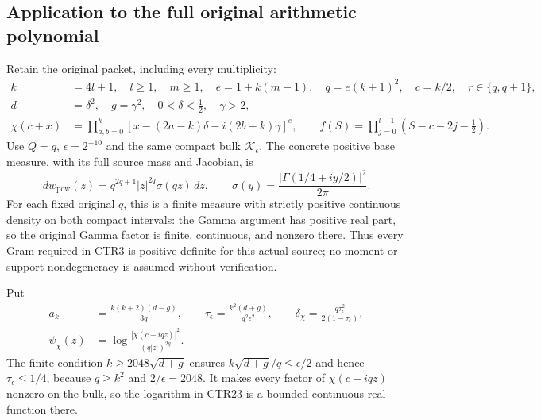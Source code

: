 \documentclass[11pt,a4paper]{article}
\begin{document}
\subsection{Application to the full original arithmetic polynomial}
Retain the original packet, including every multiplicity:
\[
 \begin{split}
 k&=4l+1,\quad l\geq1,\quad m\geq1,\quad e=1+k(m-1),\quad
 q=e(k+1)^2,\quad c=k/2,\quad r\in\{q,q+1\},\\
 d&=\delta^2,\quad g=\gamma^2,\quad 0<\delta<\tfrac12,\quad\gamma>2,\\
 \chi(c+x)&=\prod_{a,b=0}^k
       [x-(2a-k)\delta-i(2b-k)\gamma]^e,\qquad
 f(S)=\prod_{j=0}^{l-1}(S-c-2j-\tfrac12).
 \end{split}
 \tag{CTR21}
\]
Use $Q=q$, $\epsilon=2^{-10}$ and the same compact bulk
$\mathcal K_\epsilon$. The concrete positive base measure, with its full
source mass and Jacobian, is
\[
 dw_{\mathrm{pow}}(z)
   =q^{2q+1}|z|^{2q}\sigma(qz)\,dz,\qquad
 \sigma(y)=\frac{|\Gamma(1/4+iy/2)|^2}{2\pi}.
 \tag{CTR22}
\]
For each fixed original $q$, this is a finite measure with strictly
positive continuous density on both compact intervals: the Gamma
argument has positive real part, so the original Gamma factor is finite,
continuous, and nonzero there. Thus every Gram required in CTR3 is
positive definite for this actual source; no moment or support
nondegeneracy is assumed without verification.

Put
\[
 \begin{split}
 a_k&=\frac{k(k+2)(d-g)}{3q},\qquad
 \tau_\epsilon=\frac{k^2(d+g)}{q^2\epsilon^2},\qquad
 \delta_\chi=\frac{q\tau_\epsilon^2}{2(1-\tau_\epsilon)},\\
 \psi_\chi(z)&=\log\frac{|\chi(c+iqz)|^2}{(q|z|)^{2q}}.
 \end{split}
 \tag{CTR23}
\]
The finite condition $k\geq2048\sqrt{d+g}$ ensures
$k\sqrt{d+g}/q\leq\epsilon/2$ and hence $\tau_\epsilon\leq1/4$,
because $q\geq k^2$ and $2/\epsilon=2048$.
It makes every factor of $\chi(c+iqz)$ nonzero on the bulk, so the
logarithm in CTR23 is a bounded continuous real function there.
\end{document}
